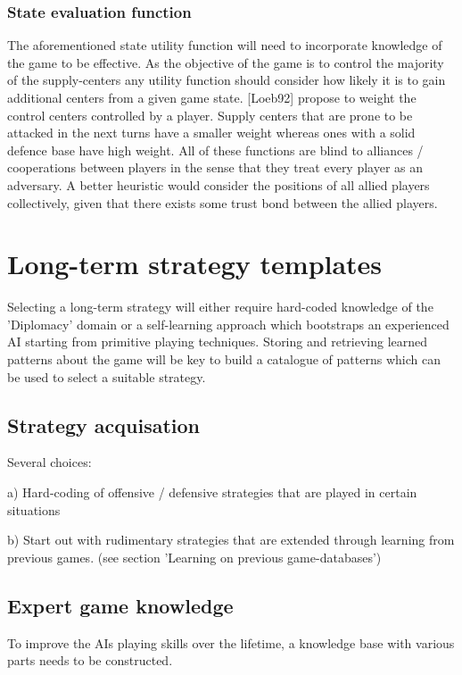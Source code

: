 \documentclass[12pt]{article}
\begin{document}
\subsubsection{State evaluation function}

The aforementioned state utility function will need to incorporate knowledge
of the game to be effective. As the objective of the game is to control the 
majority of the supply-centers any utility function should consider how likely
it is to gain additional centers from a given game state. [Loeb92] propose to 
weight the control centers controlled by a player. Supply centers that are
prone to be attacked in the next turns have a smaller weight whereas ones with
a solid defence base have high weight. All of these functions are blind to 
alliances / cooperations between players in the sense that they treat every 
player as an adversary. A better heuristic would consider the positions of
all allied players collectively, given that there exists some trust bond
between the allied players. 


\section{Long-term strategy templates}

Selecting a long-term strategy will either require hard-coded 
knowledge of the 'Diplomacy' domain or a self-learning approach which
bootstraps an experienced AI starting from primitive playing techniques.
Storing and retrieving learned patterns about the game will be key to build
a catalogue of patterns which can be used to select a suitable strategy.

\subsection{Strategy acquisation}

Several choices: 

a) Hard-coding of offensive / defensive 
   strategies that are played in certain
   situations

b) Start out with rudimentary strategies that
   are extended through learning from previous games.
   (see section 'Learning on previous game-databases')

\subsection{Expert game knowledge}

To improve the AIs playing skills over the lifetime, a
knowledge base with various parts needs to be constructed.
\end{document}
